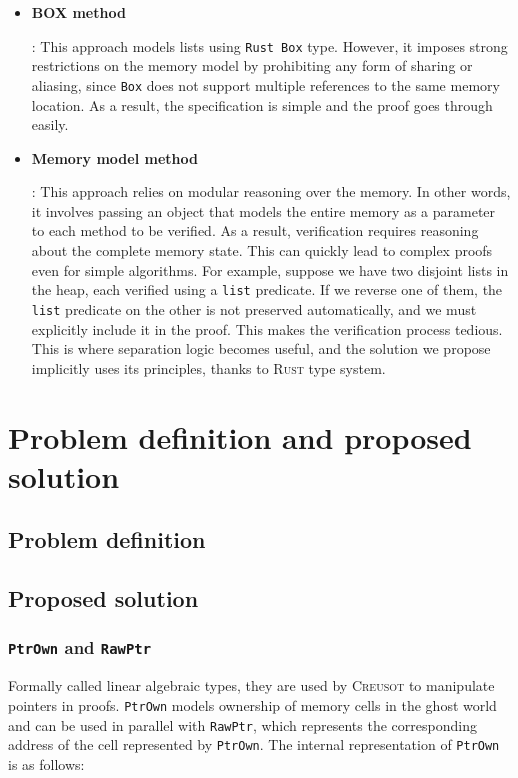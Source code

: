 \documentclass[11pt,a4paper]{report}
\begin{document}
\begin{itemize}
\item \hypertarget{BOXmeth}{\textbf{\textsc{BOX} method}}: This approach models lists using \texttt{Rust Box} type. However, it imposes strong restrictions on the memory model by prohibiting any form of sharing or aliasing, since \texttt{Box} does not support multiple references to the same memory location. As a result, the specification is simple and the proof goes through easily.
\item \hypertarget{MEMmodel}{\textbf{Memory model method}}: This approach relies on modular reasoning over the memory. In other words, it involves passing an object that models the entire memory as a parameter to each method to be verified. As a result, verification requires reasoning about the complete memory state. This can quickly lead to complex proofs even for simple algorithms. For example, suppose we have two disjoint lists in the heap, each verified using a \texttt{list} predicate. If we reverse one of them, the \texttt{list} predicate on the other is not preserved automatically, and we must explicitly include it in the proof. This makes the verification process tedious. This is where separation logic becomes useful, and the solution we propose implicitly uses its principles, thanks to \textsc{Rust} type system.
\end{itemize}

\chapter{Problem definition and proposed solution}

\section{Problem definition}

\section{Proposed solution}
\subsection{\texttt{PtrOwn} and \texttt{RawPtr}} Formally called linear algebraic types, they are used by \textsc{Creusot} to manipulate pointers in proofs. \texttt{PtrOwn} models ownership of memory cells in the ghost world and can be used in parallel with \texttt{RawPtr}, which represents the corresponding address of the cell represented by \texttt{PtrOwn}. The internal representation of \texttt{PtrOwn} is as follows:
\end{document}
